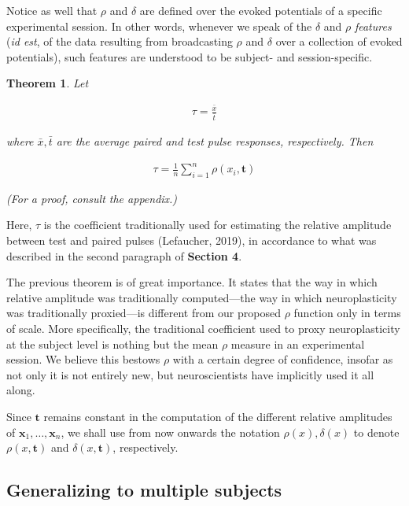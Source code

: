 \documentclass{article}
\newtheorem{theorem}{Theorem}
\begin{document}
\begin{multicols}{2}
Notice as well that $\rho$ and $\delta$ are defined over the evoked potentials
of a specific experimental session. In other words, whenever we speak of the
$\delta$ and $\rho$ \textit{features} (\textit{id est}, of the data resulting
from broadcasting $\rho$ and $\delta$ over a collection of evoked potentials),
such features are understood to be subject- and session-specific.


\begin{theorem}

    Let 

    \begin{align*}
        \tau = \frac{\bar{x}}{\bar{t}}
    \end{align*}

    where $\bar{x}, \bar{t}$ are the average paired and test pulse responses,
    respectively. Then

    \begin{align*}
        \tau = \frac{1}{n} \sum_{i = 1}^n \rho(x_i, \textbf{t})
    \end{align*}

    (For a proof, consult the appendix.)
\end{theorem}

Here, $\tau$ is the coefficient traditionally used for estimating the relative
amplitude between test and paired pulses (Lefaucher, 2019), in accordance to
what was described in the second paragraph of \textbf{Section 4}.

The previous theorem is of great importance. It states that the way in which
relative amplitude was traditionally computed---the way in which neuroplasticity
was traditionally proxied---is different from our proposed $\rho$ function only
in terms of scale. More specifically, the traditional coefficient used to proxy
neuroplasticity at the subject level is nothing but the mean $\rho$ measure in
an experimental session. We believe this bestows $\rho$ with a certain degree of
confidence, insofar as not only it is not entirely new, but neuroscientists have
implicitly used it all along.


Since $\textbf{t}$ remains constant in the computation of the different relative
amplitudes of $\textbf{x}_1, \ldots, \textbf{x}_n$, we shall use from now
onwards the notation $\rho(x), \delta(x)$ to denote $\rho(x, \textbf{t})$ and
$\delta(x, \textbf{t})$, respectively.

\subsection{Generalizing to multiple subjects}



\end{multicols}
\end{document}
